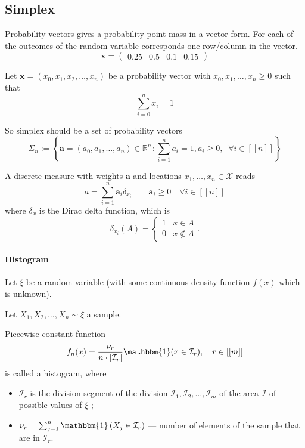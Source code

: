 

\subsection{Simplex}


Probability vectors gives a probability point mass in a vector form.
For each of the outcomes of the random variable corresponds one row/column in the vector.
$$
\mathbf{x} = \begin{pmatrix}
0.25 & 0.5 & 0.1 & 0.15
\end{pmatrix}
$$

Let $\mathbf{x} = (x_{0}, x_{1}, x_{2}, \dots, x_{n})$ be a probability vector
with $x_0, x_1, \ldots, x_n \ge 0$ such that
$$
\sum_{i=0}^{n} x_{i} = 1
$$

So simplex should be a set of probability vectors
$$
\Sigma_{n} := \left\{
  \mathbf{a} = \left( a_0, a_1, \ldots, a_n \right)  \in \mathbb{R}_{+}^{n} :
\sum_{i=1}^{n} a_{i} = 1,
a_i \ge 0, \;\; \forall i \in  [[n]]
\right\}
$$

\begin{definition}
  A discrete measure with weights $\mathbf{a}$ and locations $x_{1}, \dots, x_{n} \in \mathcal{X}$ reads
$$
a = \sum_{i=1}^{n} \mathbf{a}_{i} \delta_{x_{i}}
\qquad \mathbf{a}_i \ge 0 \quad \forall i \in  [[n]]
$$
where $\delta_{x}$ is the Dirac delta function, which is
\[ \delta_{x_i} (A) = \begin{cases}
  1 & x \in A \\
  0 & x \not\in A
\end{cases}. \]
\end{definition}

\paragraph{Histogram}

Let $\xi$ be a random variable
(with some continuous density function $f(x)$ which is unknown).

Let $X_1, X_2, \ldots, X_n \sim \xi$ a sample.

\begin{definition}[Histogram]
  Piecewise constant function
  \[ f_n(x) = \frac{\nu_r}{ n \cdot |\mathcal{I}_r|} \mathbbm{1} (x \in \mathcal{I}_r), \quad r \in [[m]] \]
  is called a histogram, where
  \begin{itemize}
    \item $\mathcal{I}_r$ is the division segment of the division $\mathcal{I}_1, \mathcal{I}_2, \ldots, \mathcal{I}_m$ of the area $\mathcal{I}$ of possible values of $\xi$ ;
    \item $\nu_r = \sum_{j=1}^{n} \mathbbm{1} \left( X_j \in \mathcal{I}_r \right)$ ---
      number of elements of the sample that are in $\mathcal{I}_r$.
  \end{itemize}
\end{definition}

